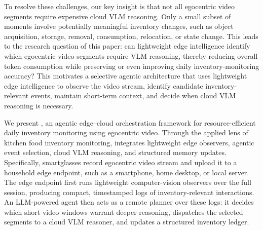 To resolve these challenges, our key insight is that not all egocentric video segments require expensive cloud VLM reasoning.
%
Only a small subset of moments involve potentially meaningful inventory changes, such as object acquisition, storage, removal, consumption, relocation, or state change.
%
This leads to the research question of this paper: can lightweight edge intelligence identify which egocentric video segments require VLM reasoning, thereby reducing overall token consumption while preserving or even improving daily inventory-monitoring accuracy?
%
This motivates a selective agentic architecture that uses lightweight edge intelligence to observe the video stream, identify candidate inventory-relevant events, maintain short-term context, and decide when cloud VLM reasoning is necessary.

We present \sys{}, an agentic edge--cloud orchestration framework for resource-efficient daily inventory monitoring using egocentric video.
%
Through the applied lens of kitchen food inventory monitoring, \sys{} integrates lightweight edge observers, agentic event selection, cloud VLM reasoning, and structured memory updates.
%
Specifically, smartglasses record egocentric video stream and upload it to a household edge endpoint, such as a smartphone, home desktop, or local server.
%
The edge endpoint first runs lightweight computer-vision observers over the full session, producing compact, timestamped logs of inventory-relevant interactions.
%
An LLM-powered agent then acts as a remote planner over these logs: it decides which short video windows warrant deeper reasoning, dispatches the selected segments to a cloud VLM reasoner, and updates a structured inventory ledger.

